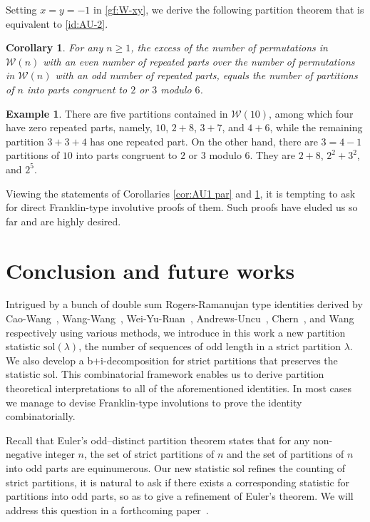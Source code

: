 \documentclass[11pt,reqno]{amsart}
\numberwithin{equation}{section}
\theoremstyle{plain}
\newtheorem{corollary}[theorem]{Corollary}
\theoremstyle{definition}
\newtheorem{example}[theorem]{Example}
\def\sol{\mathrm{sol}}
\def\la{\lambda}
\newcommand{\W}{\mathcal{W}}
\begin{document}
Setting $x=y=-1$ in \eqref{gf:W-xy}, we derive the following partition theorem that is equivalent to \eqref{id:AU-2}. 
\begin{corollary}\label{cor:AU2 par}
For any $n\ge 1$, the excess of the number of permutations in $\W(n)$ with an even number of repeated parts over the number of permutations in $\W(n)$ with an odd number of repeated parts, equals the number of partitions of $n$ into parts congruent to $2$ or $3$ modulo $6$.
\end{corollary}

\begin{example}
There are five partitions contained in $\W(10)$, among which four have zero repeated parts, namely, $10$, $2+8$, $3+7$, and $4+6$, while the remaining partition $3+3+4$ has one repeated part. On the other hand, there are $3=4-1$ partitions of $10$ into parts congruent to $2$ or $3$ modulo $6$. They are $2+8$, $2^2+3^2$, and $2^5$.
\end{example}

Viewing the statements of Corollaries \ref{cor:AU1 par} and \ref{cor:AU2 par}, it is tempting to ask for direct Franklin-type involutive proofs of them. Such proofs have eluded us so far and are highly desired.









\section{Conclusion and future works}

Intrigued by a bunch of double sum Rogers-Ramanujan type identities derived by Cao-Wang~\cite{CW23}, Wang-Wang~\cite{WW23}, Wei-Yu-Ruan~\cite{WYR23}, Andrews-Uncu~\cite{AU23}, Chern~\cite{che23}, and Wang~\cite{wan23} respectively using various methods, we introduce in this work a new partition statistic $\sol(\la)$, the number of sequences of odd length in a strict partition $\la$. We also develop a b$+$i-decomposition for strict partitions that preserves the statistic $\sol$. This combinatorial framework enables us to derive partition theoretical interpretations to all of the aforementioned identities. In most cases we manage to devise Franklin-type involutions to prove the identity combinatorially. 

Recall that Euler's odd--distinct partition theorem states that for any non-negative integer $n$, the set of strict partitions of $n$ and the set of partitions of $n$ into odd parts are equinumerous. Our new statistic $\sol$ refines the counting of strict partitions, it is natural to ask if there exists a corresponding statistic for partitions into odd parts, so as to give a refinement of Euler's theorem. We will address this question in a forthcoming paper~\cite{FL24}.
 
\end{document}

